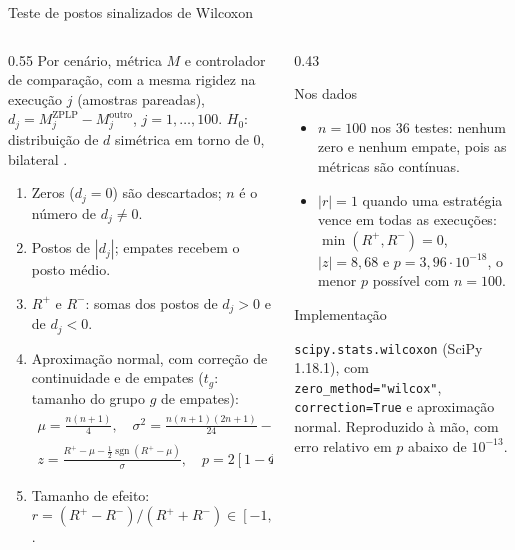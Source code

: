 \begin{frame}{Teste de postos sinalizados de Wilcoxon}
  \begin{columns}[T]
    \begin{column}{0.55\textwidth}
      \footnotesize
      Por cenário, métrica $M$ e controlador de comparação, com a mesma rigidez na execução $j$ (amostras pareadas), $d_j = M_j^{\text{ZPLP}} - M_j^{\text{outro}}$, $j = 1, \dots, 100$.
      $H_0$: distribuição de $d$ simétrica em torno de 0, bilateral \cite{Wilcoxon:1945,Conover:1980}.
      \begin{enumerate}
        \setlength{\itemsep}{0.05cm}
        \item \alert{Zeros} ($d_j = 0$) são descartados; $n$ é o número de $d_j \neq 0$.
        \item Postos de $|d_j|$; \alert{empates} recebem o posto médio.
        \item $R^{+}$ e $R^{-}$: somas dos postos de $d_j > 0$ e de $d_j < 0$.
        \item Aproximação normal, com correção de continuidade e de empates ($t_g$: tamanho do grupo $g$ de empates):
          \begin{gather*}
            \mu = \tfrac{n(n+1)}{4},
            \quad
            \sigma^2 = \tfrac{n(n+1)(2n+1)}{24} - \textstyle\sum_g \tfrac{t_g^3 - t_g}{48}, \\
            z = \frac{R^{+} - \mu - \frac{1}{2}\operatorname{sgn}(R^{+} - \mu)}{\sigma},
            \quad
            p = 2\left[1 - \Phi(|z|)\right].
          \end{gather*}
        \item Tamanho de efeito: $r = (R^{+} - R^{-}) / (R^{+} + R^{-}) \in [-1, 1]$ \cite{Kerby:2014}.
      \end{enumerate}
    \end{column}
    \begin{column}{0.43\textwidth}
      \begin{block}{Nos dados}
        \footnotesize
        \begin{itemize}
          \item $n = 100$ nos 36 testes: \alert{nenhum zero e nenhum empate}, pois as métricas são contínuas.
          \item $|r| = 1$ quando uma estratégia vence em todas as execuções: $\min(R^{+}, R^{-}) = 0$, $|z| = 8{,}68$ e $p = 3{,}96 \cdot 10^{-18}$, o menor $p$ possível com $n = 100$.
        \end{itemize}
      \end{block}
      \begin{exampleblock}{Implementação}
        \footnotesize
        \raggedright
        \texttt{scipy.stats.wilcoxon} (SciPy 1.18.1), com \texttt{zero\_method="wilcox"}, \texttt{correction=True} e aproximação normal. Reproduzido à mão, com erro relativo em $p$ abaixo de $10^{-13}$.
      \end{exampleblock}
    \end{column}
  \end{columns}
\end{frame}

